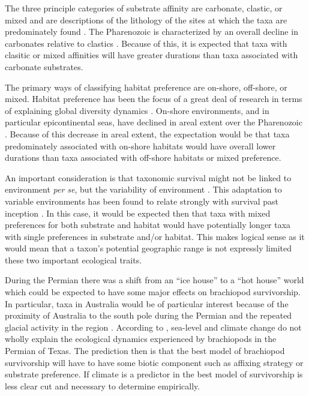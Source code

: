 \documentclass[12pt,letterpaper]{article}
\begin{document}
The three principle categories of substrate affinity are carbonate, clastic, or mixed and are descriptions of the lithology of the sites at which the taxa are predominately found \citep{Foote2006,Anderson2011a,Nurnberg2013a,Kiessling2007a,Miller2001}. The Pharenozoic is characterized by an overall decline in carbonates relative to clastics \citep{Foote2006,Miller2001}. Because of this, it is expected that taxa with clasitic or mixed affinities will have greater durations than taxa associated with carbonate substrates. %

The primary ways of classifying habitat preference are on-shore, off-shore, or mixed. Habitat preference has been the focus of a great deal of research in terms of explaining global diversity dynamics \citep{Sepkoski1991}. On-shore environments, and in particular epicontinental seas, have declined in areal extent over the Pharenozoic \citep{Peters2008}. Because of this decrease in areal extent, the expectation would be that taxa predominately associated with on-shore habitats would have overall lower durations than taxa associated with off-shore habitats or mixed preference.

An important consideration is that taxonomic survival might not be linked to environment \textit{per se}, but the variability of environment \citep{Foote2013,Heim2011,Liow2007b}. This adaptation to variable environments has been found to relate strongly with survival past inception \citep{Foote2013}. In this case, it would be expected then that taxa with mixed preferences for both substrate and habitat would have potentially longer taxa with single preferences in substrate and/or habitat. This makes logical sense as it would mean that a taxon's potential geographic range is not expressly limited these two important ecological traits. 

During the Permian there was a shift from an ``ice house'' to a ``hot house'' world \citep{Fielding2006,Birgenheier2010,Jones2006,Powell2007} which could be expected to have some major effects on brachiopod survivorship. In particular, taxa in Australia would be of particular interest because of the proximity of Australia to the south pole during the Permian and the repeated glacial activity in the region \citep{Fielding2006,Birgenheier2010,Jones2006}. According to \citet{Olszewski2004}, sea-level and climate change do not wholly explain the ecological dynamics experienced by brachiopods in the Permian of Texas. The prediction then is that the best model of brachiopod survivorship will have to have some biotic component such as affixing strategy or substrate preference. If climate is a predictor in the best model of survivorship is less clear cut and necessary to determine empirically.
\end{document}
